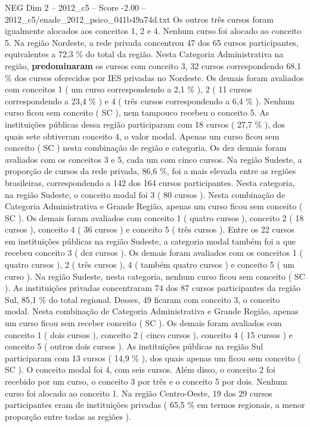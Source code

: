 \begin{textsample}{NEG Dim 2 – 2012\_c5 – Score -2.00 – 2012\_c5/enade\_2012\_psico\_041b49a74d.txt}
Os outros três cursos foram igualmente alocados aos conceitos 1, 2 e 4.
Nenhum curso foi alocado ao conceito 5.
Na região Nordeste, a rede privada concentrou 47 dos 65 cursos participantes, equivalentes a 72,3 \% do total da região.
Nesta Categoria Administrativa na região, \textbf{predominaram} os cursos com conceito 3, 32 cursos correspondendo 68,1 \% dos cursos oferecidos por IES privadas no Nordeste.
Os demais foram avaliados com conceitos 1 ( um curso correspondendo a 2,1 \% ), 2 ( 11 cursos correspondendo a 23,4 \% ) e 4 ( três cursos correspondendo a 6,4 \% ).
Nenhum curso ficou sem conceito ( SC ), nem tampouco recebeu o conceito 5.
As instituições públicas dessa região participaram com 18 cursos ( 27,7 \% ), dos quais sete obtiveram conceito 4, o valor modal.
Apenas um curso ficou sem conceito ( SC ) nesta combinação de região e categoria.
Os dez demais foram avaliados com os conceitos 3 e 5, cada um com cinco cursos.
Na região Sudeste, a proporção de cursos da rede privada, 86,6 \%, foi a mais elevada entre as regiões brasileiras, correspondendo a 142 dos 164 cursos participantes.
Nesta categoria, na região Sudeste, o conceito modal foi 3 ( 80 cursos ).
Nesta combinação de Categoria Administrativa e Grande Região, apenas um curso ficou sem conceito ( SC ).
Os demais foram avaliados com conceito 1 ( quatro cursos ), conceito 2 ( 18 cursos ), conceito 4 ( 36 cursos ) e conceito 5 ( três cursos ).
Entre os 22 cursos em instituições públicas na região Sudeste, a categoria modal também foi a que recebeu conceito 3 ( dez cursos ).
Os demais foram avaliados com os conceitos 1 ( quatro cursos ), 2 ( três cursos ), 4 ( também quatro cursos ) e conceito 5 ( um curso ).
Na região Sudeste, nesta categoria, nenhum curso ficou sem conceito ( SC ).
As instituições privadas concentraram 74 dos 87 cursos participantes da região Sul, 85,1 \% do total regional.
Desses, 49 ficaram com conceito 3, o conceito modal.
Nesta combinação de Categoria Administrativa e Grande Região, apenas um curso ficou sem receber conceito ( SC ).
Os demais foram avaliados com conceito 1 ( dois cursos ), conceito 2 ( cinco cursos ), conceito 4 ( 15 cursos ) e conceito 5 ( outros dois cursos ).
As instituições públicas na região Sul participaram com 13 cursos ( 14,9 \% ), dos quais apenas um ficou sem conceito ( SC ).
O conceito modal foi 4, com seis cursos.
Além disso, o conceito 2 foi recebido por um curso, o conceito 3 por três e o conceito 5 por dois.
Nenhum curso foi alocado ao conceito 1.
Na região Centro-Oeste, 19 dos 29 cursos participantes eram de instituições privadas ( 65,5 \% em termos regionais, a menor proporção entre todas as regiões ).

\end{textsample}
